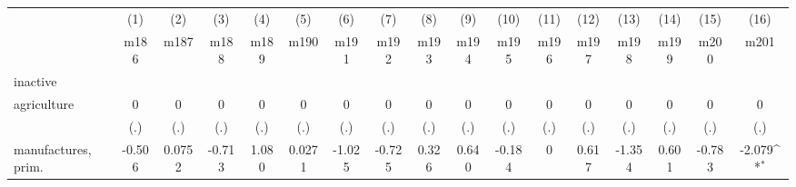 {
\def\sym#1{\ifmmode^{#1}\else\(^{#1}\)\fi}
\begin{tabular}{l*{16}{c}}
\hline\hline
                    &\multicolumn{1}{c}{(1)}&\multicolumn{1}{c}{(2)}&\multicolumn{1}{c}{(3)}&\multicolumn{1}{c}{(4)}&\multicolumn{1}{c}{(5)}&\multicolumn{1}{c}{(6)}&\multicolumn{1}{c}{(7)}&\multicolumn{1}{c}{(8)}&\multicolumn{1}{c}{(9)}&\multicolumn{1}{c}{(10)}&\multicolumn{1}{c}{(11)}&\multicolumn{1}{c}{(12)}&\multicolumn{1}{c}{(13)}&\multicolumn{1}{c}{(14)}&\multicolumn{1}{c}{(15)}&\multicolumn{1}{c}{(16)}\\
                    &\multicolumn{1}{c}{m186}&\multicolumn{1}{c}{m187}&\multicolumn{1}{c}{m188}&\multicolumn{1}{c}{m189}&\multicolumn{1}{c}{m190}&\multicolumn{1}{c}{m191}&\multicolumn{1}{c}{m192}&\multicolumn{1}{c}{m193}&\multicolumn{1}{c}{m194}&\multicolumn{1}{c}{m195}&\multicolumn{1}{c}{m196}&\multicolumn{1}{c}{m197}&\multicolumn{1}{c}{m198}&\multicolumn{1}{c}{m199}&\multicolumn{1}{c}{m200}&\multicolumn{1}{c}{m201}\\
\hline
inactive            &                     &                     &                     &                     &                     &                     &                     &                     &                     &                     &                     &                     &                     &                     &                     &                     \\
agriculture         &           0         &           0         &           0         &           0         &           0         &           0         &           0         &           0         &           0         &           0         &           0         &           0         &           0         &           0         &           0         &           0         \\
                    &         (.)         &         (.)         &         (.)         &         (.)         &         (.)         &         (.)         &         (.)         &         (.)         &         (.)         &         (.)         &         (.)         &         (.)         &         (.)         &         (.)         &         (.)         &         (.)         \\
[1em]
manufactures, prim. &      -0.506         &      0.0752         &      -0.713         &       1.080         &      0.0271         &      -1.025         &      -0.725         &       0.326         &       0.640         &      -0.184         &           0         &       0.617         &      -1.354         &       0.601         &      -0.783         &      -2.079\sym{*}  \\

\end{tabular}}
